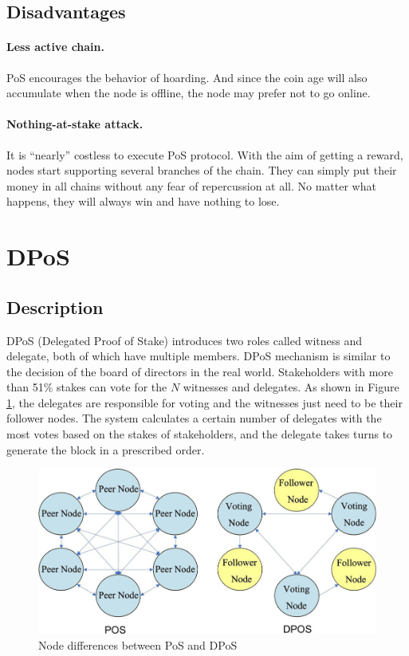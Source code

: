 \documentclass[lang=en]{sjtuarticle}
\begin{document}
\subsection{Disadvantages}

\paragraph{Less active chain.} PoS encourages the behavior of hoarding. And since the coin age will also accumulate
when the node is offline, the node may prefer not to go
online.

\paragraph{Nothing-at-stake attack.} It is ``nearly'' costless to execute PoS protocol. With the aim of getting a reward,
nodes start supporting several branches of the chain. They can simply put their money in all chains without any fear of repercussion
at all. No matter what happens, they will always win and
have nothing to lose.


\section{DPoS}

\subsection{Description}

DPoS (Delegated Proof of Stake) \cite{dpos} introduces two
roles called witness and delegate, both of which have
multiple members. DPoS mechanism is similar to the decision of the board
of directors in the real world. Stakeholders
with more than 51\% stakes can vote for the $N$ witnesses
and delegates. As shown in Figure \ref{fig:dpos}, the delegates are
responsible for voting and the witnesses just need to be
their follower nodes. The system calculates a certain number of delegates with the most votes based on the stakes of stakeholders, and the delegate takes turns to generate the block
in a prescribed order.

\begin{figure}[h]
    \centering
    \includegraphics{DPoS.jpg}
    \caption{Node differences between PoS and DPoS}
    \label{fig:dpos}
\end{figure}
\end{document}
